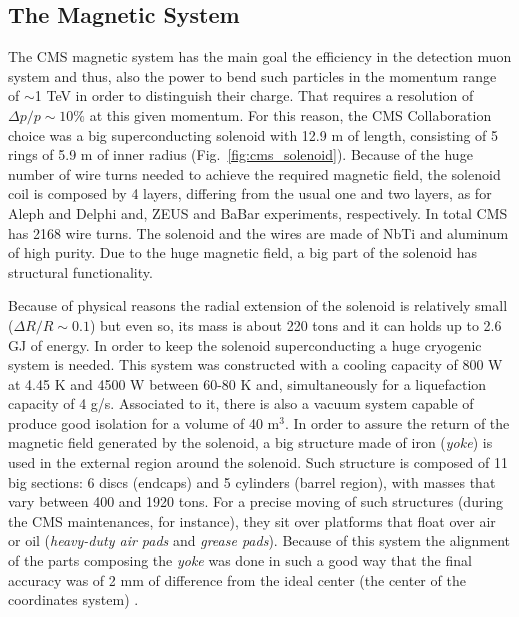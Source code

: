 \subsection{The Magnetic System}
The CMS magnetic system has the main goal the efficiency in the detection muon system and thus, also the power to bend such particles in the momentum range of $\sim$1 TeV in order to distinguish their charge. That requires a resolution of $\Delta p/p \sim10\%$ at this given momentum. For this reason, the CMS Collaboration choice was a big superconducting solenoid with 12.9 m of length, consisting of 5 rings of 5.9 m of inner radius (Fig.~\ref{fig:cms_solenoid}). Because of the huge number of wire turns needed to achieve the required magnetic field, the solenoid coil is composed by 4 layers, differing from the usual one and two layers, as for Aleph and Delphi and, ZEUS and BaBar experiments, respectively. In total CMS has 2168 wire turns. The solenoid and the wires are made of NbTi and aluminum of high purity. Due to the huge magnetic field, a big part of the solenoid has structural functionality.

Because of physical reasons the radial extension of the solenoid is relatively small ($\Delta R/R \sim 0.1$) but even so, its mass is about 220 tons and it can holds up to 2.6 GJ of energy. In order to keep the solenoid superconducting a huge cryogenic system is needed. This system was constructed with a cooling capacity of 800 W at 4.45 K and 4500 W between 60-80 K and, simultaneously for a liquefaction capacity of 4 g/s. Associated to it, there is also a vacuum system capable of produce good isolation for a volume of 40 m$^{3}$. In order to assure the return of the magnetic field generated by the solenoid, a big structure made of iron (\textit{yoke}) is used in the external region around the solenoid. Such structure is composed of 11 big sections: 6 discs (endcaps) and 5 cylinders (barrel region), with masses that vary between 400 and 1920 tons. For a precise moving of such structures (during the CMS maintenances, for instance), they sit over platforms that float over air or oil (\textit{heavy-duty air pads} and \textit{grease pads}). Because of this system the alignment of the parts composing the \textit{yoke} was done in such a good way that the final accuracy was of 2 mm of difference from the ideal center (the center of the coordinates system) \cite{bib:JINST-3-362-2008}.

